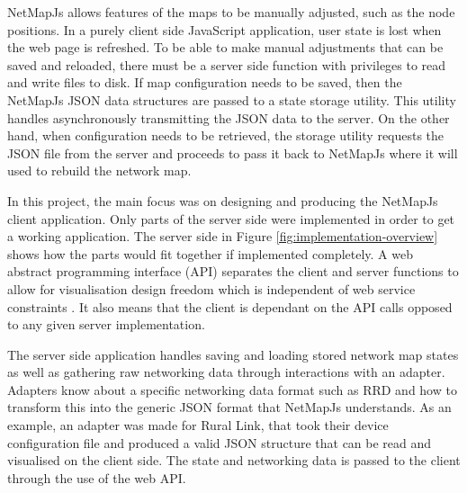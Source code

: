 \documentclass[11pt, a4paper]{article}
\begin{document}
NetMapJs allows features of the maps to be manually adjusted, such as the node
positions. In a purely client side JavaScript application, user state is lost
when the web page is refreshed. To be able to make manual adjustments that can
be saved and reloaded, there must be a server side function with privileges to
read and write files to disk. If map configuration needs to be saved, then the
NetMapJs JSON data structures are passed to a state storage utility. This
utility handles asynchronously transmitting the JSON data to the server. On the
other hand, when configuration needs to be retrieved, the storage utility
requests the JSON file from the server and proceeds to pass it back to NetMapJs
where it will used to rebuild the network map.

In this project, the main focus was on designing and producing the NetMapJs
client application. Only parts of the server side were implemented in order to
get a working application. The server side in Figure
\ref{fig:implementation-overview} shows how the parts would fit together if
implemented completely. A web abstract programming interface (API) separates the
client and server functions to allow for visualisation design freedom which is
independent of web service constraints \cite{Wood_2008}. It also means that the
client is dependant on the API calls opposed to any given server implementation.

The server side application handles saving and loading stored network map states
as well as gathering raw networking data through interactions with an adapter.
Adapters know about a specific networking data format such as RRD and how to
transform this into the generic JSON format that NetMapJs understands. As an
example, an adapter was made for Rural Link, that took their device
configuration file and produced a valid JSON structure that can be read and
visualised on the client side. The state and networking data is passed to the
client through the use of the web API.
\end{document}
